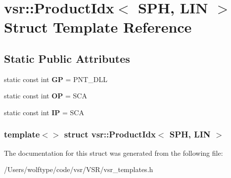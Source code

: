 \hypertarget{structvsr_1_1_product_idx_3_01_s_p_h_00_01_l_i_n_01_4}{\section{vsr\-:\-:Product\-Idx$<$ S\-P\-H, L\-I\-N $>$ Struct Template Reference}
\label{structvsr_1_1_product_idx_3_01_s_p_h_00_01_l_i_n_01_4}
}
\subsection*{Static Public Attributes}
\begin{DoxyCompactItemize}
\item 
\hypertarget{structvsr_1_1_product_idx_3_01_s_p_h_00_01_l_i_n_01_4_aeca426ef06ce2a2436b8a337e5d61388}{static const int {\bfseries G\-P} = P\-N\-T\-\_\-\-D\-L\-L}\label{structvsr_1_1_product_idx_3_01_s_p_h_00_01_l_i_n_01_4_aeca426ef06ce2a2436b8a337e5d61388}

\item 
\hypertarget{structvsr_1_1_product_idx_3_01_s_p_h_00_01_l_i_n_01_4_ac2366817bd2ea8187d0eee976384d525}{static const int {\bfseries O\-P} = S\-C\-A}\label{structvsr_1_1_product_idx_3_01_s_p_h_00_01_l_i_n_01_4_ac2366817bd2ea8187d0eee976384d525}

\item 
\hypertarget{structvsr_1_1_product_idx_3_01_s_p_h_00_01_l_i_n_01_4_a9982462e62f564023283ee5cf7e8bfdb}{static const int {\bfseries I\-P} = S\-C\-A}\label{structvsr_1_1_product_idx_3_01_s_p_h_00_01_l_i_n_01_4_a9982462e62f564023283ee5cf7e8bfdb}

\end{DoxyCompactItemize}
\subsubsection*{template$<$$>$ struct vsr\-::\-Product\-Idx$<$ S\-P\-H, L\-I\-N $>$}



The documentation for this struct was generated from the following file\-:\begin{DoxyCompactItemize}
\item 
/\-Users/wolftype/code/vsr/\-V\-S\-R/vsr\-\_\-templates.\-h\end{DoxyCompactItemize}
